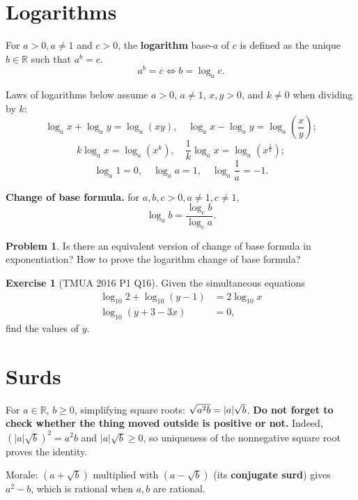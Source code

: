 \documentclass[11pt]{article}
\theoremstyle{definition}
\newtheorem{example}[theorem]{Exercise}
\newtheorem{problem}[theorem]{Problem}
\theoremstyle{remark}
\newcommand{\pqty}[1]{\left(#1\right)}
\DeclarePairedDelimiter{\abs}{\lvert}{\rvert}
\newcommand{\RR}{\mathbb{R}}
\begin{document}
\section{Logarithms}\label{tmua-1-section-003}

For \(a > 0, a \neq 1\) and \(c > 0\), the \textbf{logarithm} base-\(a\) of \(c\) is defined as the unique \(b \in \RR\) such that \(a^b = c\).
\[
    a^b = c \iff b = \log_a c.
\]  

Laws of logarithms below assume \(a>0\), \(a\ne1\), \(x,y>0\), and \(k\ne0\) when dividing by \(k\):
\[
    \log_a x + \log_a y = \log_a \pqty{xy}, \quad \log_a x - \log_a y = \log_a \pqty{\frac{x}{y}};
\]
\[
    k \log_a x = \log_a \pqty{x^k}, \quad \frac{1}{k} \log_a x = \log_a \pqty{x^{\frac{1}{k}}};
\]
\[
    \log_a 1 = 0, \quad \log_a a = 1, \quad \log_a \frac{1}{a} = -1.
\]

\textbf{Change of base formula.} for \(a, b, c > 0, a \neq 1, c \neq 1\),
\[
    \log_a b = \frac{\log_c b}{\log_c a}.
\]

\begin{problem}\label{tmua-1-unit-011}
    Is there an equivalent version of change of base formula in exponentiation? How to prove the logarithm change of base formula?
\end{problem}

\begin{example}[TMUA 2016 P1 Q16]\label{tmua-1-unit-012}
    Given the simultaneous equations
    \begin{align*}
        \log_{10} 2 + \log_{10} \pqty{y - 1} &= 2 \log_{10} x \\
        \log_{10} \pqty{y + 3 - 3x} &= 0,
    \end{align*}
    find the values of \(y\).
\end{example}

\section{Surds}\label{tmua-1-section-004}

For \(a\in\RR\), \(b\ge0\), simplifying square roots: \(\sqrt{a^2 b} = \abs{a}\sqrt{b}\). \textbf{Do not forget to check whether the thing moved outside is positive or not.} Indeed, \((|a|\sqrt b)^2=a^2b\) and \(|a|\sqrt b\ge0\), so uniqueness of the nonnegative square root proves the identity.

Morale: \(\pqty{a + \sqrt{b}}\) multiplied with \(\pqty{a - \sqrt{b}}\) (its \textbf{conjugate surd}) gives \(a^2 - b\), which is rational when \(a,b\) are rational.
\end{document}
